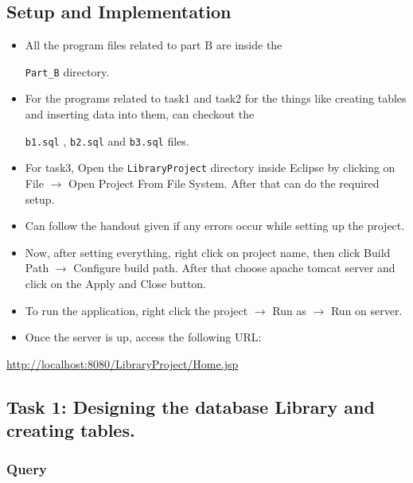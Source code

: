 \documentclass[12pt]{article}
\let\oldtexttt\texttt
\renewcommand{\texttt}[1]{
  \colorbox{bgcolor}{\oldtexttt{#1}}
  }
\begin{document}
\subsection{Setup and Implementation}

\begin{itemize}
\item  All the program files related to part B are inside the 
    \texttt{Part\_B} directory. 
\item  For the programs related to task1 and task2 for the things like        
    creating tables and inserting data into them, can checkout the 
    \texttt{b1.sql}, \texttt{b2.sql} and \texttt{b3.sql} files. 
\item  For task3, Open the \texttt{LibraryProject} directory inside Eclipse by 
    clicking on File $\rightarrow$ Open Project From File System. After that can do the required setup.
\item  Can follow the handout given if any errors occur while setting up the 
    project.
\item  Now, after setting everything, right click on project name, then
    click Build Path $\rightarrow$ Configure build path. After that
    choose apache tomcat server and click on the Apply and Close button.
\item  To run the application, right click the project $\rightarrow$ Run as 
    $\rightarrow$ Run on server.
\item Once the server is up, access the following URL:    
\end{itemize}

\vspace{-2mm}

{\centerline{\underline{http://localhost:8080/LibraryProject/Home.jsp}}}

\newpage

\subsection{Task 1: Designing the database Library and creating tables.}

\subsubsection*{Query}
\end{document}
